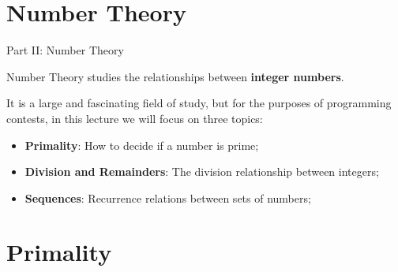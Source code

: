 
\section{Number Theory}
\begin{frame}{Part II: Number Theory}

  Number Theory studies the relationships between {\bf integer numbers}.\bigskip

  It is a large and fascinating field of study, but for the purposes of programming contests, in this lecture we will focus on three topics:\bigskip

  \begin{itemize}
  \item {\bf Primality}: How to decide if a number is prime;
  \item {\bf Division and Remainders}: The division relationship between integers;
  \item {\bf Sequences}: Recurrence relations between sets of numbers;
  \end{itemize}
\end{frame}

\section{Primality}
